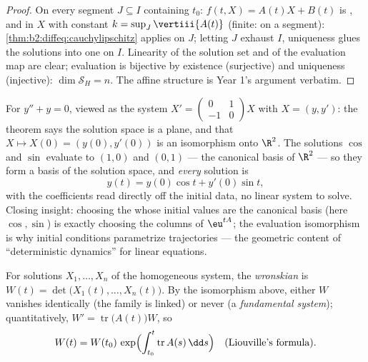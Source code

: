 \begin{proof}
On every segment $J \subseteq I$ containing $t_0$: $f(t, X) =
A(t)X + B(t)$ is , and  in $X$ with constant $k
= \sup_J \vertiii{A(t)}$ (finite:  on a segment):
\cref{thm:b2:diffeq:cauchylipschitz} applies on $J$; letting $J$
exhaust $I$, uniqueness glues the solutions into one on $I$.
Linearity of the solution set and of the evaluation map are clear;
evaluation is bijective by existence (surjective) and uniqueness
(injective): $\dim \mathcal{S}_H = n$. The affine structure is Year
1's argument verbatim.
\end{proof}

\begin{example}\label{ex:b2:diffeq:evaliso}
For $y'' + y = 0$, viewed as the system $X' =
\begin{pmatrix} 0 & 1\\ -1 & 0\end{pmatrix}X$ with $X = (y,
y')$: the theorem says the solution space is a plane, and that
$X \mapsto X(0) = (y(0), y'(0))$ is an isomorphism onto
$\R^2$. The solutions $\cos$ and $\sin$ evaluate to $(1, 0)$
and $(0, 1)$ --- the canonical basis of $\R^2$ --- so they form
a basis of the solution space, and \emph{every} solution is
\[
y(t) = y(0)\cos t + y'(0)\sin t ,
\]
with the coefficients read directly off the initial data, no
linear system to solve. Closing insight: choosing the
 whose initial values are the canonical
basis (here $\cos, \sin$) is exactly choosing the columns of
$\eu^{tA}$; the evaluation isomorphism is why initial
conditions parametrize trajectories --- the geometric content
of ``deterministic dynamics'' for linear equations.
\end{example}

\begin{definition}[Wronskian]\label{def:b2:diffeq:wronskian}
For solutions $X_1, \dots, X_n$ of the homogeneous system, the
\emph{wronskian} is $W(t) = \det\bigl(X_1(t),
\dots, X_n(t)\bigr)$. By the isomorphism above, either $W$ vanishes
identically (the family is linked) or never (a \emph{fundamental
system}); quantitatively, $W' = \operatorname{tr}\bigl(A(t)\bigr)
W$, so
\[
W(t) = W(t_0)\,\exp\Bigl(\int_{t_0}^{t}
\operatorname{tr} A(s)\,\dd s\Bigr)
\quad \text{(Liouville's formula)}.
\]
\end{definition}

